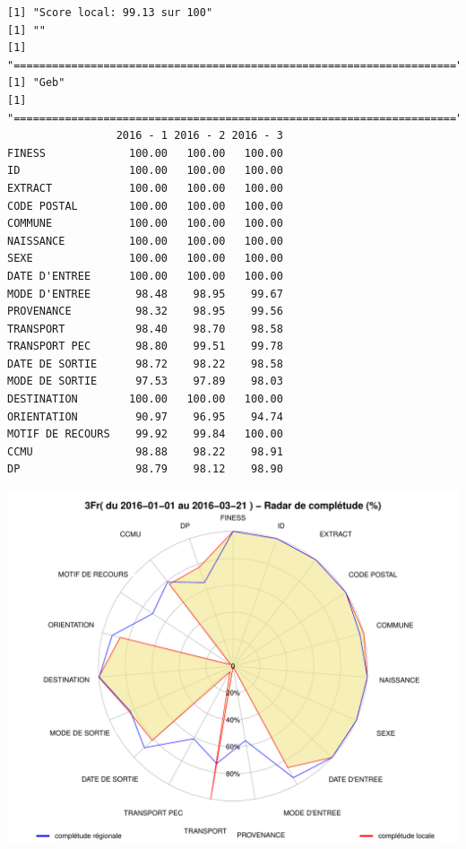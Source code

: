 \documentclass[]{article}
\begin{document}
\begin{verbatim}
[1] "Score local: 99.13 sur 100"
[1] ""
[1] "====================================================================="
[1] "Geb"
[1] "====================================================================="
                 2016 - 1 2016 - 2 2016 - 3
FINESS             100.00   100.00   100.00
ID                 100.00   100.00   100.00
EXTRACT            100.00   100.00   100.00
CODE POSTAL        100.00   100.00   100.00
COMMUNE            100.00   100.00   100.00
NAISSANCE          100.00   100.00   100.00
SEXE               100.00   100.00   100.00
DATE D'ENTREE      100.00   100.00   100.00
MODE D'ENTREE       98.48    98.95    99.67
PROVENANCE          98.32    98.95    99.56
TRANSPORT           98.40    98.70    98.58
TRANSPORT PEC       98.80    99.51    99.78
DATE DE SORTIE      98.72    98.22    98.58
MODE DE SORTIE      97.53    97.89    98.03
DESTINATION        100.00   100.00   100.00
ORIENTATION         90.97    96.95    94.74
MOTIF DE RECOURS    99.92    99.84   100.00
CCMU                98.88    98.22    98.91
DP                  98.79    98.12    98.90
\end{verbatim}

\includegraphics{completude_files/figure-latex/finess-6.pdf}
\end{document}
